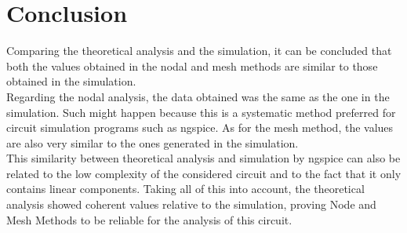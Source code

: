 \newpage
\section{Conclusion}
\label{sec:conclusion}
Comparing the theoretical analysis and the simulation, it can be concluded that both the values obtained in the nodal 
and mesh methods are similar to those obtained in the simulation. \\
\noindent Regarding the nodal analysis, the data obtained was the same as the one in the simulation. 
Such might happen because this is a systematic method preferred for circuit simulation programs such as ngspice.
As for the mesh method, the values are also very similar to the ones generated in the simulation. \\
This similarity between theoretical analysis and simulation by ngspice can also be related to the low complexity of the considered circuit
and to the fact that it only contains linear components.
\noindent Taking all of this into account, the theoretical analysis showed coherent values relative to the simulation, 
proving Node and Mesh Methods to be reliable for the analysis of this circuit.


